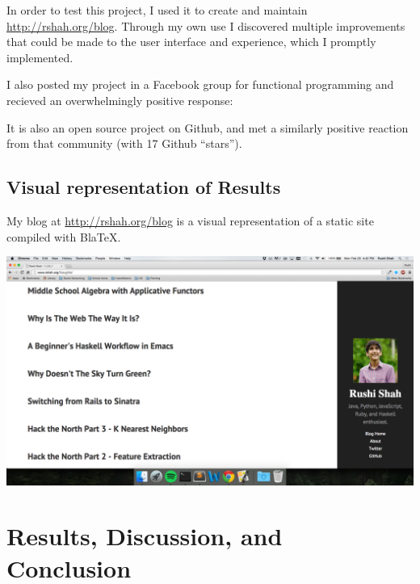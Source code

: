 \documentclass[doc,apacite,12pt]{apa6}
\begin{document}
  In order to test this project, I used it to create and maintain \url{http://rshah.org/blog}. Through my own use I discovered multiple improvements that could be made to the user interface and experience, which I promptly implemented. 

  I also posted my project in a Facebook group for functional programming and recieved an overwhelmingly positive response: 


  It is also an open source project on Github, and met a similarly positive reaction from that community (with 17 Github ``stars''). 

\subsection{Visual representation of Results}

  My blog at \url{http://rshah.org/blog} is a visual representation of a static site compiled with BlaTeX.

  \centerline{\includegraphics[width=.8\textwidth]{BlaTeX_screenshot}}

\section{Results, Discussion, and Conclusion}



% 
\end{document}
